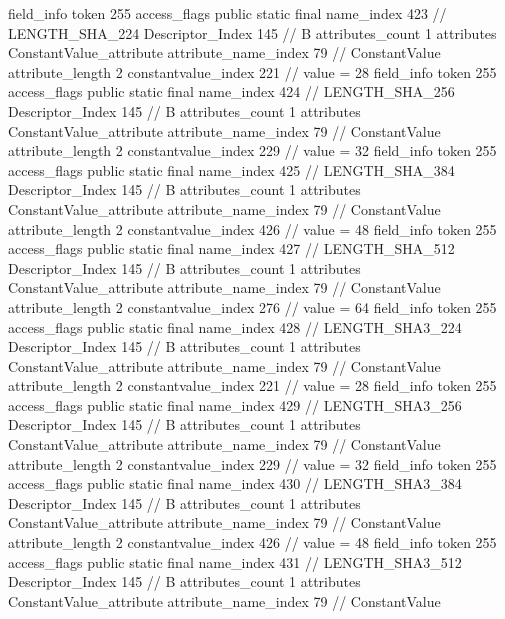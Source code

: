 {{{{{{				}
			}
			field_info {
				token	255
				access_flags	public static final
				name_index	423		// LENGTH_SHA_224
				Descriptor_Index	145		// B
				attributes_count	1
				attributes {
				ConstantValue_attribute {
					attribute_name_index	79		// ConstantValue
					attribute_length	2
					constantvalue_index	221		// value = 28
				}
				}
			}
			field_info {
				token	255
				access_flags	public static final
				name_index	424		// LENGTH_SHA_256
				Descriptor_Index	145		// B
				attributes_count	1
				attributes {
				ConstantValue_attribute {
					attribute_name_index	79		// ConstantValue
					attribute_length	2
					constantvalue_index	229		// value = 32
				}
				}
			}
			field_info {
				token	255
				access_flags	public static final
				name_index	425		// LENGTH_SHA_384
				Descriptor_Index	145		// B
				attributes_count	1
				attributes {
				ConstantValue_attribute {
					attribute_name_index	79		// ConstantValue
					attribute_length	2
					constantvalue_index	426		// value = 48
				}
				}
			}
			field_info {
				token	255
				access_flags	public static final
				name_index	427		// LENGTH_SHA_512
				Descriptor_Index	145		// B
				attributes_count	1
				attributes {
				ConstantValue_attribute {
					attribute_name_index	79		// ConstantValue
					attribute_length	2
					constantvalue_index	276		// value = 64
				}
				}
			}
			field_info {
				token	255
				access_flags	public static final
				name_index	428		// LENGTH_SHA3_224
				Descriptor_Index	145		// B
				attributes_count	1
				attributes {
				ConstantValue_attribute {
					attribute_name_index	79		// ConstantValue
					attribute_length	2
					constantvalue_index	221		// value = 28
				}
				}
			}
			field_info {
				token	255
				access_flags	public static final
				name_index	429		// LENGTH_SHA3_256
				Descriptor_Index	145		// B
				attributes_count	1
				attributes {
				ConstantValue_attribute {
					attribute_name_index	79		// ConstantValue
					attribute_length	2
					constantvalue_index	229		// value = 32
				}
				}
			}
			field_info {
				token	255
				access_flags	public static final
				name_index	430		// LENGTH_SHA3_384
				Descriptor_Index	145		// B
				attributes_count	1
				attributes {
				ConstantValue_attribute {
					attribute_name_index	79		// ConstantValue
					attribute_length	2
					constantvalue_index	426		// value = 48
				}
				}
			}
			field_info {
				token	255
				access_flags	public static final
				name_index	431		// LENGTH_SHA3_512
				Descriptor_Index	145		// B
				attributes_count	1
				attributes {
				ConstantValue_attribute {
					attribute_name_index	79		// ConstantValue
}}}}}}}
